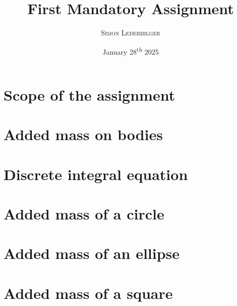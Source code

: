 \documentclass{article}
\title{First Mandatory Assignment}
\subtitle{\textit{\headcourse}}
\author{\textsc{Simon Lederhilger}}
\date{January 28\textsuperscript{th} 2025}
\begin{document}
\maketitle\thispagestyle{fancy}
\begin{multicols*}{2}
  \section[Scope]{Scope of the assignment}
  
  
  \section[Added mass]{Added mass on bodies}
  

  \section[Discrete form]{Discrete integral equation}
  

  \section[Circle]{Added mass of a circle}
  

  \section[Ellipse]{Added mass of an ellipse}
  

  \section[Square]{Added mass of a square}
  

  \printbibliography
\end{multicols*}
\end{document}
